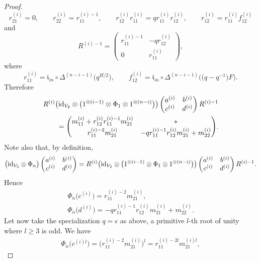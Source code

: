 \documentclass[pdftex]{sigma}%
\numberwithin{equation}{section}
\numberwithin{figure}{section}
\begin{document}
\begin{proof}
\[
r_{21}^{(i)}=0,\qquad
r_{22}^{(i)} = r_{11}^{(i)-1},\qquad
r_{12}^{(i)}r_{11}^{(i)}= q r_{11}^{(i)}r_{12}^{(i)},\qquad
r_{12}^{(i)} = r_{11}^{(i)}f_{12}^{(i)}
\]
and
\[
R^{(i)-1} =\begin{pmatrix} r_{11}^{(i)-1}&-qr_{12}^{(i)}\\[.5ex] 0 &r_{11}^{(i)}\end{pmatrix}\!,
\]
where
\begin{equation*}%
r_{11}^{(i)} = \mathfrak{i}_{in}\circ \Delta^{(n-i-1)}\big(q^{H/2}\big),\qquad f_{12}^{(i)} = \mathfrak{i}_{in}\circ \Delta^{(n-i-1)}\big(\big(q-q^{-1}\big)F\big).
\end{equation*}
Therefore
\begin{gather*}
R^{(i)}\big({\rm id}_{V_2}\otimes \big(1^{\otimes (i-1)} \otimes \Phi_1 \otimes 1^{\otimes (n-i)}\big)\big)\begin{pmatrix} a^{(i)}&b^{(i)}\\ c^{(i)}&d^{(i)}\end{pmatrix}R^{(i)-1}
\\ \qquad
{} = \begin{pmatrix} m_{11}^{(i)}+r_{12}^{(i)}r_{11}^{(i)-1}m_{21}^{(i)} & * \\[.5ex] r_{11}^{(i)-2}m_{21}^{(i)} & -qr_{11}^{(i)-1}r_{12}^{(i)}m_{21}^{(i)} + m_{22}^{(i)} \end{pmatrix}\!.
\end{gather*}
Note also that, by definition,
\[
\big({\rm id}_{V_2} \otimes \Phi_n\big)\begin{pmatrix} a^{(i)}&b^{(i)}\\ c^{(i)}&d^{(i)}\end{pmatrix} = R^{(i)}\big( {\rm id}_{V_2}\otimes \big(1^{\otimes (i-1)} \otimes \Phi_1 \otimes 1^{\otimes (n-i)}\big)\big)\begin{pmatrix} a^{(i)}&b^{(i)}\\ c^{(i)}&d^{(i)}\end{pmatrix}R^{(i)-1}.
\]
Hence
\begin{gather*}
\Phi_n\big(c^{(i)}\big) = r_{11}^{(i)-2}m_{21}^{(i)},
\\
\Phi_n\big(d^{(i)}\big) = -qr_{11}^{(i)-1}r_{12}^{(i)}m_{21}^{(i)} + m_{22}^{(i)} .
\end{gather*}
Let now take the specialization $q=\epsilon$ as above, a primitive $l$-th root of unity where $l \geq 3$ is odd. We have
\begin{gather}
\Phi_n\big(c^{(i)l}\big) = \big(r_{11}^{(i)-2}m_{21}^{(i)}\big)^l = r_{11}^{(i)-2l}m_{21}^{(i)l},\label{Phincl}

\end{gather}
\end{proof}
\end{document}
